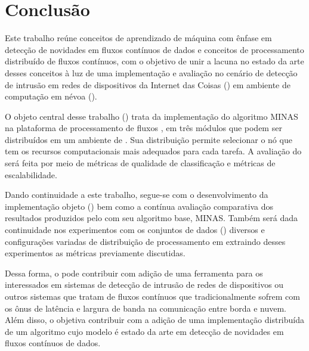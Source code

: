 
\chapter{Conclusão}\label{cha:final}


Este trabalho reúne conceitos de aprendizado de máquina com ênfase em detecção
de novidades em fluxos contínuos de dados e conceitos de processamento
distribuído de fluxos contínuos, com o objetivo de unir a lacuna no estado da
arte desses conceitos à luz de uma implementação e avaliação no cenário de
detecção de intrusão em redes de dispositivos da Internet das Coisas (\iot) em
ambiente de computação em névoa (\fog).

O objeto central desse trabalho (\mfog) trata da implementação do algoritmo MINAS na
plataforma de processamento de fluxos \flink, em três módulos que podem ser
distribuídos em um ambiente de \fog.
Sua distribuição permite selecionar o nó que tem os recursos computacionais mais
adequados para cada tarefa.
A avaliação do \mfog será feita por
meio de métricas de qualidade
de classificação e métricas de escalabilidade.

Dando continuidade a este trabalho, segue-se com o desenvolvimento da implementação objeto
(\mfog) bem como a contínua avaliação comparativa dos resultados
produzidos pelo \mfog com seu algoritmo base, MINAS.
Também será dada continuidade nos experimentos com os conjuntos de dados (\datasets)
diversos e configurações variadas de distribuição de processamento em \fog
extraindo desses experimentos as métricas previamente discutidas.

Dessa forma, o \mfog pode contribuir com adição de uma ferramenta para os interessados
em sistemas de detecção de intrusão de redes de dispositivos \iot
ou outros sistemas que tratam de fluxos contínuos que tradicionalmente sofrem
com os ônus de latência e largura de banda na comunicação entre borda e nuvem.
Além disso, o \mfog objetiva contribuir com a adição de uma implementação
distribuída de um algoritmo cujo modelo é estado da arte em detecção de
novidades em fluxos contínuos de dados.


